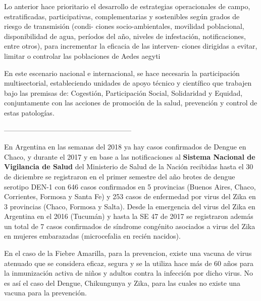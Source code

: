 Lo anterior hace prioritario el desarrollo de  estrategias operacionales de campo, estratificadas,
participativas,  complementarias  y  sostenibles  según  grados  de  riesgo  de  transmisión  (condi-
ciones  socio-ambientales,  movilidad  poblacional,  disponibilidad  de  agua,  períodos  del  año,
niveles de infestación, notificaciones, entre otros), para incrementar la eficacia de las interven-
ciones dirigidas a evitar, limitar o controlar las poblaciones de
Aedes aegyti


En  este  escenario  nacional  e  internacional,  se  hace  necesaria  la  participación  multisectorial,
estableciendo unidades  de  apoyo  técnico  y  científico  que  trabajen  bajo
las  premisas de:  Cogestión, Participación Social, Solidaridad y Equidad, conjuntamente con las
acciones de promoción de la salud, prevención y control de estas patologías.


------------------------------------------------------

En Argentina en las semanas del 2018 ya hay casos confirmados de Dengue en Chaco,
y durante el 2017 y en base a las notificaciones al
\textbf{Sistema Nacional de Vigilancia de Salud} del Ministerio de Salud de la Nación
recibidas hasta el 30 de diciembre se registraron en el primer semestre del año brotes de
dengue serotipo DEN-1 con 646 casos confirmados en 5 provincias
(Buenos Aires, Chaco, Corrientes, Formosa y Santa Fe) y 253 casos de enfermedad
por virus del Zika en 3 provincias (Chaco, Formosa y Salta).
Desde la emergencia del virus del Zika en Argentina en el 2016 (Tucumán) y hasta
la SE 47 de 2017 se registraron además un total de 7 casos confirmados de
síndrome congénito asociados a virus del Zika en mujeres embarazadas (microcefalia en recién nacidos).

\par En el caso de la Fiebre Amarilla, para la prevencion, existe una vacuna de
virus atenuado que se considera eficaz, segura y se la utiliza hace más
de 60 años para la inmunización activa de niños y adultos contra la infección
por dicho virus. No es así el caso del Dengue, Chikungunya y Zika, para las
cuales no existe una vacuna para la prevención.


